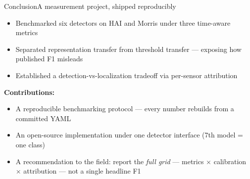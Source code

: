 \documentclass[aspectratio=169,11pt]{beamer}
\begin{document}
\begin{frame}{Conclusion}{A measurement project, shipped reproducibly}
\begin{itemize}\itemsep4pt
  \item Benchmarked six detectors on HAI and Morris under three time-aware metrics
  \item Separated representation transfer from threshold transfer --- exposing how published F1 misleads
  \item Established a detection-vs-localization tradeoff via per-sensor attribution
\end{itemize}
\vspace{1mm}
{\color{teal}\bfseries Contributions:}
\begin{itemize}\itemsep3pt
  \item A reproducible benchmarking protocol --- every number rebuilds from a committed YAML
  \item An open-source implementation under one detector interface (7th model = one class)
  \item A recommendation to the field: report the \emph{full grid} --- metrics $\times$ calibration $\times$ attribution --- not a single headline F1
\end{itemize}
\end{frame}

{
\begin{frame}[plain]
\end{frame}}
\end{document}
